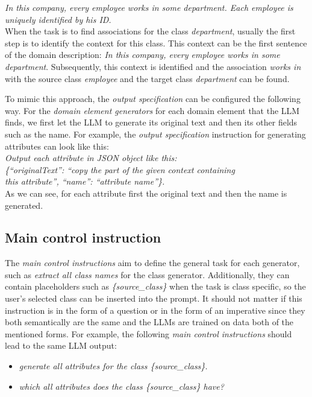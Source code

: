 \noindent{}\textit{In this company, every employee works in some department. Each employee is uniquely identified by his ID.} \\

\noindent{}When the task is to find associations for the class \textit{department}, usually the first step is to identify the context for this class. This context can be the first sentence of the domain description: \textit{In this company, every employee works in some department}. Subsequently, this context is identified and the association \textit{works in} with the source class \textit{employee} and the target class \textit{department} can be found.

To mimic this approach, the \emph{output specification} can be configured the following way. For the \emph{domain element generators} for each domain element that the LLM finds, we first let the LLM to generate its original text and then its other fields such as the name. For example, the \emph{output specification} instruction for generating attributes can look like this: \\

\noindent{}\textit{Output each attribute in JSON object like this: \\
\{``originalText'': ``copy the part of the given context containing \\ this attribute'', ``name'': ``attribute name''\}.} \\

\noindent{}As we can see, for each attribute first the original text and then the name is generated.


\subsection{Main control instruction}

The \emph{main control instructions} aim to define the general task for each generator, such as \textit{extract all class names} for the class generator. Additionally, they can contain placeholders such as \textit{\{source\_class\}} when the task is class specific, so the user's selected class can be inserted into the prompt. It should not matter if this instruction is in the form of a question or in the form of an imperative since they both semantically are the same and the LLMs are trained on data both of the mentioned forms. For example, the following \emph{main control instructions} should lead to the same LLM output:

\begin{itemize}
\item \textit{generate all attributes for the class \{source\_class\}.}
\item \textit{which all attributes does the class \{source\_class\} have?}
\end{itemize}


